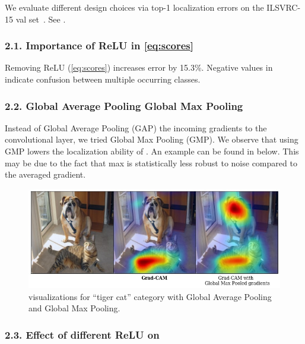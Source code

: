 We evaluate different design choices via top-1 localization errors on the ILSVRC-15
val set~\cite{imagenet_cvpr09}. See .
\subsubsection*{2.1. Importance of ReLU in \eqref{eq:scores}}

Removing ReLU (\eqref{eq:scores}) increases error by 15.3\%.
Negative values in \gcam{} indicate confusion between multiple occurring classes.






\subsubsection*{2.2. Global Average Pooling \vs Global Max Pooling}

Instead of Global Average Pooling (GAP) the incoming gradients to the convolutional layer,
we tried Global Max Pooling (GMP). We observe that using GMP lowers the localization ability
of \gcam{}. An example can be found in  below. This may be due to the fact
that max is statistically less robust to noise compared to the averaged gradient.

\begin{figure}[h]

     \centering
     \includegraphics[width=1\linewidth]{figures/gcam_ablation_gap_gmp.jpg}
     \caption{\gcam{} visualizations for ``tiger cat'' category with Global Average Pooling and Global Max Pooling.}
     \label{fig:gmp}

   \end{figure}

\subsubsection*{2.3. Effect of different ReLU on \gcam{}}

